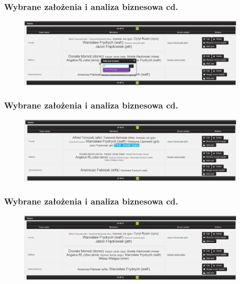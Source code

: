 \documentclass[hyperref={pdfpagelabels=false}]{beamer}
\begin{document}
\begin{frame}
	\frametitle{Wybrane założenia i analiza biznesowa cd.}
	\begin{figure}
		\centering
		\includegraphics[height=0.5\linewidth, width=1\linewidth]{team-list-add}
	\end{figure}
\end{frame}\begin{frame}
\frametitle{Wybrane założenia i analiza biznesowa cd.}
\begin{figure}
	\centering
	\includegraphics[height=0.5\linewidth, width=1\linewidth]{team-list-del}
\end{figure}
\end{frame}\begin{frame}
\frametitle{Wybrane założenia i analiza biznesowa cd.}
\begin{figure}
	\centering
	\includegraphics[height=0.5\linewidth, width=1\linewidth]{team-list-del-2}
\end{figure}
\end{frame}
\end{document}
